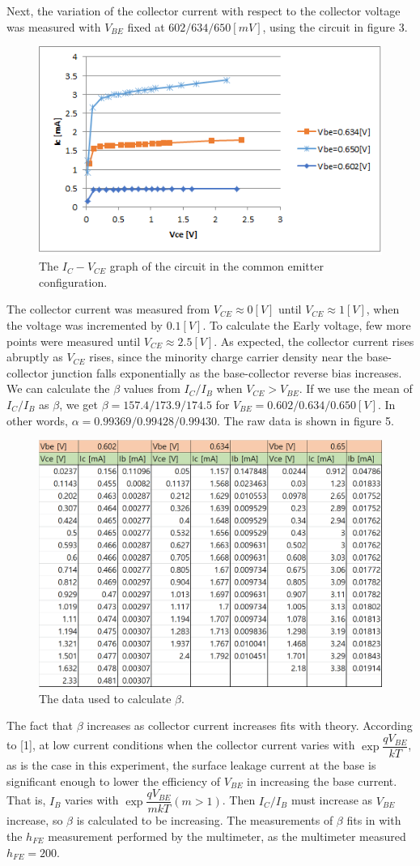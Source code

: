 \documentclass[a4paper, itemph]{oblivoir}
\theoremstyle{definition}
\begin{document}
Next, the variation of the collector current with respect to the collector voltage was measured with $V_{BE}$ fixed at $602/634/650[mV]$, using the circuit in figure 3.
\begin{figure}[htb]
    \centering
    \includegraphics[width=0.5\linewidth]{CE.png}
    \caption{The $I_C-V_{CE}$ graph of the circuit in the common emitter configuration.}
\end{figure}

The collector current was measured from $V_{CE}\approx0[V]$ until $V_{CE}\approx1[V]$, when the voltage was incremented by $0.1[V]$. To calculate the Early voltage, few more points were measured until $V_{CE}\approx 2.5[V]$. As expected, the collector current rises abruptly as $V_{CE}$ rises, since the minority charge carrier density near the base-collector junction falls exponentially as the base-collector reverse bias increases. We can calculate the $\beta$ values from $I_C/I_B$ when $V_{CE}>V_{BE}$. If we use the mean of $I_C/I_B$ as $\beta$, we get $\beta=157.4/173.9/174.5$ for $V_{BE}=0.602/0.634/0.650[V]$. In other words, $\alpha=0.99369/0.99428/0.99430$. The raw data is shown in figure 5.
\begin{figure}[htb]
    \centering
    \includegraphics[width=0.5\linewidth]{CE_data.png}
    \caption{The data used to calculate $\beta$.}
\end{figure}

The fact that $\beta$ increases as collector current increases fits with theory. According to [1], at low current conditions when the collector current varies with $\exp{\dfrac{qV_{BE}}{kT}}$, as is the case in this experiment, the surface leakage current at the base is significant enough to lower the efficiency of $V_{BE}$ in increasing the base current. That is, $I_B$ varies with $\exp{\dfrac{qV_{BE}}{mkT}}(m>1)$. Then $I_C/I_B$ must increase as $V_{BE}$ increase, so $\beta$ is calculated to be increasing. The measurements of $\beta$ fits in with the $h_{FE}$ measurement performed by the multimeter, as the multimeter measured $h_{FE}=200$.
\end{document}
